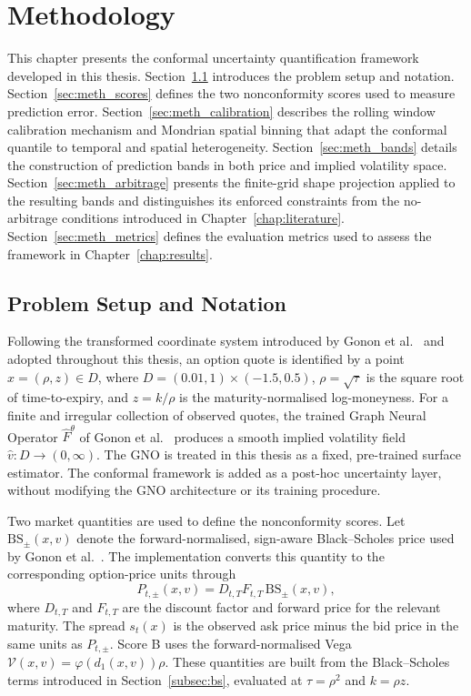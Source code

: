 \chapter{Methodology}
\label{chap:methodology}

This chapter presents the conformal uncertainty quantification framework developed in this thesis. Section~\ref{sec:meth_setup} introduces the problem setup and notation. Section~\ref{sec:meth_scores} defines the two nonconformity scores used to measure prediction error. Section~\ref{sec:meth_calibration} describes the rolling window calibration mechanism and Mondrian spatial binning that adapt the conformal quantile to temporal and spatial heterogeneity. Section~\ref{sec:meth_bands} details the construction of prediction bands in both price and implied volatility space. Section~\ref{sec:meth_arbitrage} presents the finite-grid shape projection applied to the resulting bands and distinguishes its enforced constraints from the no-arbitrage conditions introduced in Chapter~\ref{chap:literature}. Section~\ref{sec:meth_metrics} defines the evaluation metrics used to assess the framework in Chapter~\ref{chap:results}.

\section{Problem Setup and Notation}
\label{sec:meth_setup}

Following the transformed coordinate system introduced by Gonon et al.\ \cite{gonon2024operator} and adopted throughout this thesis, an option quote is identified by a point $x = (\rho, z) \in D$, where $D = (0.01, 1) \times (-1.5, 0.5)$, $\rho = \sqrt{\tau}$ is the square root of time-to-expiry, and $z = k/\rho$ is the maturity-normalised log-moneyness. For a finite and irregular collection of observed quotes, the trained Graph Neural Operator $\hat{F}^\theta$ of Gonon et al.\ \cite{gonon2024operator} produces a smooth implied volatility field $\hat{v}:D\rightarrow(0,\infty)$. The GNO is treated in this thesis as a fixed, pre-trained surface estimator. The conformal framework is added as a post-hoc uncertainty layer, without modifying the GNO architecture or its training procedure.

Two market quantities are used to define the nonconformity scores. Let $\text{BS}_{\pm}(x,v)$ denote the forward-normalised, sign-aware Black--Scholes price used by Gonon et al.\ \cite{gonon2024operator}. The implementation converts this quantity to the corresponding option-price units through
\begin{equation}
    P_{t,\pm}(x,v)=D_{t,T}F_{t,T}\,\text{BS}_{\pm}(x,v),
    \label{eq:implemented_option_price}
\end{equation}
where $D_{t,T}$ and $F_{t,T}$ are the discount factor and forward price for the relevant maturity. The spread $s_t(x)$ is the observed ask price minus the bid price in the same units as $P_{t,\pm}$. Score B uses the forward-normalised Vega $\mathcal{V}(x,v)=\varphi(d_1(x,v))\rho$. These quantities are built from the Black--Scholes terms introduced in Section~\ref{subsec:bs}, evaluated at $\tau=\rho^2$ and $k=\rho z$.

